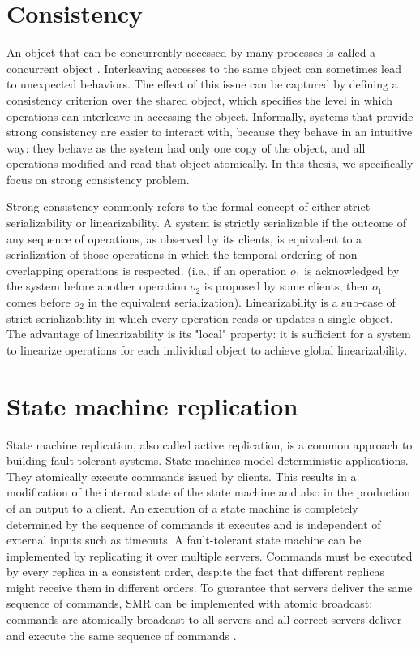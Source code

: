 \section{Consistency}
An object that can be concurrently accessed by many processes is called a
concurrent object \cite{linearizability}. Interleaving accesses to the same
object can sometimes lead to unexpected behaviors. The effect of this issue can
be captured by defining a consistency criterion over the shared object, which
specifies the level in which operations can interleave in accessing the object.
Informally, systems that provide strong consistency are easier to interact with,
because they behave in an intuitive way: they behave as the system had only one
copy of the object, and all operations modified and read that object atomically.
In this thesis, we specifically focus on strong consistency problem.

Strong consistency commonly refers to the formal concept of either strict
serializability or linearizability. A system is strictly serializable if the
outcome of any sequence of operations, as observed by its clients, is equivalent
to a serialization of those operations in which the temporal ordering of
non-overlapping operations is respected. (i.e., if an operation \emph{$o_1$} is
acknowledged by the system before another operation \emph{$o_2$} is proposed by
some clients, then \emph{$o_1$} comes before \emph{$o_2$} in the equivalent
serialization). Linearizability is a sub-case of strict serializability in which
every operation reads or updates a single object. The advantage of
linearizability is its "local" property: it is sufficient for a system to
linearize operations for each individual object to achieve global
linearizability.

\section{State machine replication}
\label{sec:smr}
State machine replication, also called active replication, is a common approach
to building fault-tolerant systems\cite{Lam78, Sch90}. State machines model
deterministic applications. They atomically execute commands issued by clients.
This results in a modification of the internal state of the state machine and
also in the production of an output to a client. An execution of a state machine
is completely determined by the sequence of commands it executes and is
independent of external inputs such as timeouts. A fault-tolerant state machine
can be implemented by replicating it over multiple servers. Commands must be
executed by every replica in a consistent order, despite the fact that different
replicas might receive them in different orders. To guarantee that servers
deliver the same sequence of commands, SMR can be implemented with atomic
broadcast: commands are atomically broadcast to all servers and all correct
servers deliver and execute the same sequence of commands \cite{BJ87b,DSU04}.

